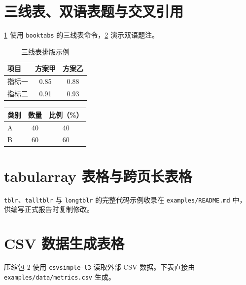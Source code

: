 \section{三线表、双语表题与交叉引用}
\ref{tab:demo-booktabs} 使用 \texttt{booktabs} 的三线表命令，\ref{tab:demo-bilingual} 演示双语题注。
\begin{table}[htbp]
  \centering
  \caption{三线表排版示例}
  \label{tab:demo-booktabs}
  \begin{tabular}{lcc}
    \toprule
    项目 & 方案甲 & 方案乙 \\
    \midrule
    指标一 & 0.85 & 0.88 \\
    指标二 & 0.91 & 0.93 \\
    \bottomrule
  \end{tabular}
\end{table}

\begin{table}[htbp]
  \centering
  \label{tab:demo-bilingual}
  \begin{tabular}{lcc}
    \toprule
    类别 & 数量 & 比例（\%）\\
    \midrule
    A & 40 & 40\\
    B & 60 & 60\\
    \bottomrule
  \end{tabular}
\end{table}

\section{tabularray 表格与跨页长表格}
\texttt{tblr}、\texttt{talltblr} 与 \texttt{longtblr} 的完整代码示例收录在 \texttt{examples/README.md} 中，供编写正式报告时复制修改。

\section{CSV 数据生成表格}
压缩包 2 使用 \texttt{csvsimple-l3} 读取外部 CSV 数据。下表直接由 \verb|examples/data/metrics.csv| 生成。
\begin{table}[htbp]
  \centering
  \caption{从 CSV 数据自动生成表格}
  \label{tab:demo-csv}
   {\csvlinetotablerow}
\end{table}

